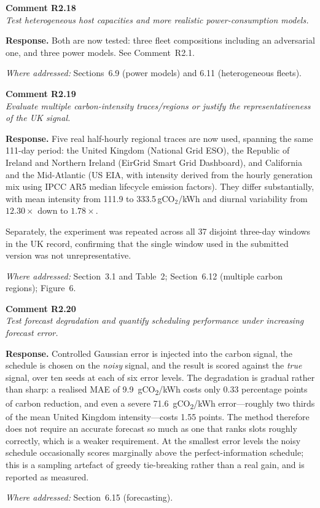 \documentclass[11pt,a4paper]{article}
\newcommand{\rsp}[1]{\vspace{2pt}\noindent\textbf{Response.} #1\par\vspace{6pt}}
\newcommand{\rwhere}[1]{\noindent\textit{Where addressed:} #1\par\vspace{10pt}}
\newenvironment{revcomment}[1]
  {\begin{tcolorbox}[colback=gray!6,colframe=gray!45,boxrule=0.4pt,
     left=6pt,right=6pt,top=4pt,bottom=4pt]\textbf{#1}\\[2pt]\itshape\color{cmt}}
  {\end{tcolorbox}\vspace{4pt}}
\begin{document}
\begin{revcomment}{Comment R2.18}
Test heterogeneous host capacities and more realistic power-consumption models.
\end{revcomment}
\rsp{Both are now tested: three fleet compositions including an adversarial one, and
three power models. See Comment~R2.1.}
\rwhere{Sections~6.9 (power models) and 6.11 (heterogeneous fleets).}

\begin{revcomment}{Comment R2.19}
Evaluate multiple carbon-intensity traces/regions or justify the representativeness
of the UK signal.
\end{revcomment}
\rsp{Five real half-hourly regional traces are now used, spanning the same 111-day
period: the United Kingdom (National Grid ESO), the Republic of Ireland and
Northern Ireland (EirGrid Smart Grid Dashboard), and California and the
Mid-Atlantic (US EIA, with intensity derived from the hourly generation mix using
IPCC AR5 median lifecycle emission factors). They differ substantially, with mean
intensity from 111.9 to 333.5\,gCO$_2$/kWh and diurnal variability from
$12.30\times$ down to $1.78\times$.

Separately, the experiment was repeated across all 37 disjoint three-day windows in
the UK record, confirming that the single window used in the submitted version was
not unrepresentative.}
\rwhere{Section~3.1 and Table~2; Section~6.12 (multiple carbon regions); Figure~6.}

\begin{revcomment}{Comment R2.20}
Test forecast degradation and quantify scheduling performance under increasing
forecast error.
\end{revcomment}
\rsp{Controlled Gaussian error is injected into the carbon signal, the schedule is chosen on the
\emph{noisy} signal, and the result is scored against the \emph{true} signal, over ten seeds at each of six
error levels. The degradation is gradual rather than sharp: a realised MAE of 9.9~gCO\textsubscript{2}/kWh
costs only 0.33 percentage points of carbon reduction, and even a severe 71.6~gCO\textsubscript{2}/kWh
error---roughly two thirds of the mean United Kingdom intensity---costs 1.55 points. The method therefore does
not require an accurate forecast so much as one that ranks slots roughly correctly, which is a weaker
requirement. At the smallest error levels the noisy schedule occasionally scores marginally above the
perfect-information schedule; this is a sampling artefact of greedy tie-breaking rather than a real gain, and
is reported as measured.}
\rwhere{Section~6.15 (forecasting).}
\end{document}
